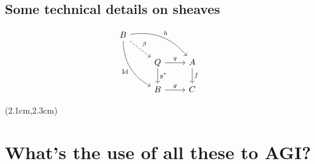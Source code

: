 \begin{preview}
\begin{minipage}{\textwidth}
\begin{itemize}
\end{itemize}


\subsection{Some technical details on sheaves}

\begin{equation}
\begin{tikzcd}
B \arrow[ddr,bend right,"\mathrm{Id}"'] \arrow[drr,bend left,"h"] \arrow[dr,dashed,"\beta"] \\
& \smash[b]{Q} \arrow[r,"q"] \arrow[d,"g^*"] & A \arrow[d,"f"] \\
& B \arrow[r,"g"] & C
\end{tikzcd}
\end{equation}

\end{minipage}
\end{preview}

\begin{preview}
\begin{textblock*}{5cm}(2.1cm,2.3cm) %
	{\color{red}{\large \textcircled{\small \themypage}}}
	\addtocounter{mypage}{1}
\end{textblock*}
	
\begin{minipage}{\textwidth}
	\setlength{\parskip}{0.4\baselineskip}
		
\section{What's the use of all these to AGI?}

		
\end{minipage}
\end{preview}


